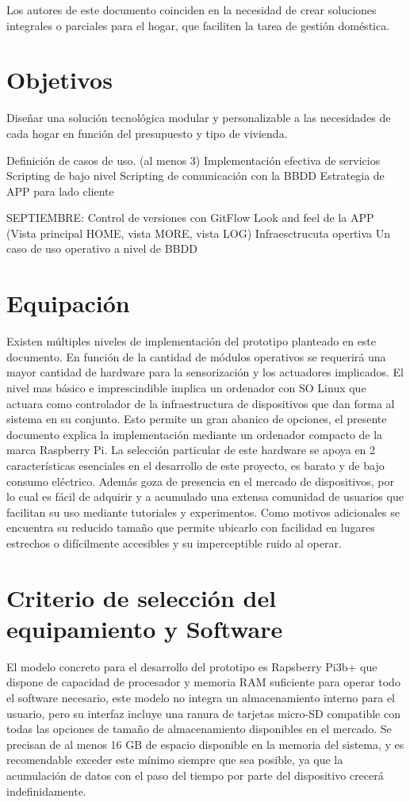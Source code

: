 Los autores de este documento coinciden en la necesidad de crear soluciones integrales o parciales para el hogar, que faciliten la tarea de gestión doméstica.


\section{Objetivos}
\label{makereference1.2}

Diseñar una solución tecnológica modular y personalizable a las necesidades de cada hogar en función del presupuesto y tipo de vivienda. 

Definición de casos de uso. (al menos 3)
Implementación efectiva de servicios
Scripting de bajo nivel
Scripting de comunicación con la BBDD	
Estrategia de APP para lado cliente

SEPTIEMBRE:
Control de versiones con GitFlow
Look and feel de la APP (Vista principal HOME, vista MORE, vista LOG)
Infraesctrucuta opertiva
Un caso de uso operativo a nivel de BBDD


\section{Equipación}
\label{makereference1.3}

Existen múltiples niveles de implementación del prototipo planteado en este documento. En función de la cantidad de módulos operativos se requerirá una mayor cantidad de hardware para la sensorización y los actuadores implicados. El nivel mas básico e imprescindible implica un ordenador con SO Linux que actuara como controlador de la infraestructura de dispositivos que dan forma al sistema en su conjunto. Esto permite un gran abanico de opciones, el presente documento explica la implementación mediante un ordenador compacto de la marca Raspberry Pi. La selección particular de este hardware se apoya en 2 características esenciales en el desarrollo de este proyecto, es barato y de bajo consumo eléctrico. Además goza de presencia en el mercado de dispositivos, por lo cual es fácil de adquirir y a acumulado una extensa comunidad de usuarios que facilitan su uso mediante tutoriales y experimentos. Como motivos adicionales se encuentra su reducido tamaño que permite ubicarlo con facilidad en lugares estrechos o difícilmente accesibles y su imperceptible ruido al operar.

\section{Criterio de selección del equipamiento y Software}
\label{makereference1.4}
El modelo concreto para el desarrollo del prototipo es Rapsberry Pi3b+ que dispone de capacidad de procesador y memoria RAM suficiente para operar todo el software necesario, este modelo no integra un almacenamiento interno para el usuario, pero su interfaz incluye una ranura de tarjetas micro-SD compatible con todas las opciones de tamaño de almacenamiento disponibles en el mercado. Se precisan de al menos 16 GB de espacio disponible en la memoria del sistema, y es recomendable exceder este mínimo siempre que sea posible, ya que la acumulación de datos con el paso del tiempo por parte del dispositivo crecerá indefinidamente.

